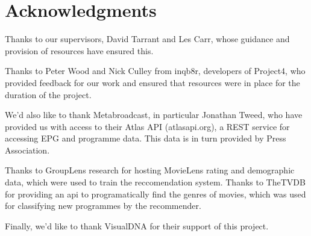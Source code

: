 \section{Acknowledgments}

Thanks to our supervisors, David Tarrant and Les Carr, whose guidance and provision of resources have ensured this.

Thanks to Peter Wood and Nick Culley from inqb8r, developers of Project4, who provided feedback for our work and ensured that resources were in place for the duration of the project.

We'd also like to thank Metabroadcast, in particular Jonathan Tweed, who have provided us with access to their Atlas API (atlasapi.org), a REST service for accessing EPG and programme data. This data is in turn provided by Press Association.

Thanks to GroupLens research for hosting MovieLens rating and demographic data, which were used to train the reccomendation system. Thanks to TheTVDB for providing an api to programatically find the genres of movies, which was used for classifying new programmes by the recommender.

Finally, we'd like to thank VisualDNA for their support of this project.

\cleardoublepage
\setcounter{tocdepth}{2}

\begin{comment}
	\tableofcontents
	\newpage
	\cleardoublepage
	\setcounter{page}{0}
	\pagenumbering{arabic}
	\cleardoublepage
\end{comment}

